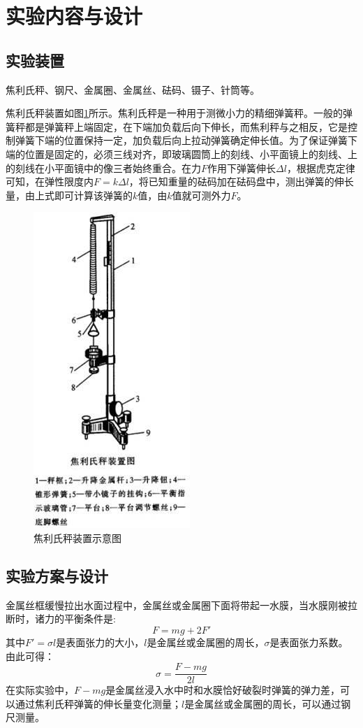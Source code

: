 \documentclass[a4paper]{extarticle}
\begin{document}
    \section{实验内容与设计}
    \subsection{实验装置}
    \hspace{2em}
    焦利氏秤、钢尺、金属圈、金属丝、砝码、镊子、针筒等。
    \par\hspace{2em}
    焦利氏秤装置如图\ref{fig:1}所示。焦利氏秤是一种用于测微小力的精细弹簧秤。一般的弹簧秤都是弹簧秤上端固定，在下端加负载后向下伸长，而焦利秤与之相反，它是控制弹簧下端的位置保持一定，加负载后向上拉动弹簧确定伸长值。为了保证弹簧下端的位置是固定的，必须三线对齐，即玻璃圆筒上的刻线、小平面镜上的刻线、上的刻线在小平面镜中的像三者始终重合。在力$F$作用下弹簧伸长$\Delta l$，根据虎克定律可知，在弹性限度内$F = k \Delta l$，将已知重量的砝码加在砝码盘中，测出弹簧的伸长量，由上式即可计算该弹簧的$k$值，由$k$值就可测外力$F$。
    \begin{figure}[H]
        \centering
        \includegraphics[width=0.3\linewidth]{jiaolishi.png}
        \caption{焦利氏秤装置示意图}
        \label{fig:1}
    \end{figure}
    \subsection{实验方案与设计}
    \hspace{2em}
    金属丝框缓慢拉出水面过程中，金属丝或金属圈下面将带起一水膜，当水膜刚被拉断时，诸力的平衡条件是:
    \begin{equation*}
        F=mg+2F'
    \end{equation*}
    其中$F'=\sigma l$是表面张力的大小，$l$是金属丝或金属圈的周长，$\sigma$是表面张力系数。由此可得：
    \begin{equation}
        \sigma=\frac{F-mg}{2l}
    \end{equation}
    在实际实验中，$F-mg$是金属丝浸入水中时和水膜恰好破裂时弹簧的弹力差，可以通过焦利氏秤弹簧的伸长量变化测量；$l$是金属丝或金属圈的周长，可以通过钢尺测量。
\end{document}
